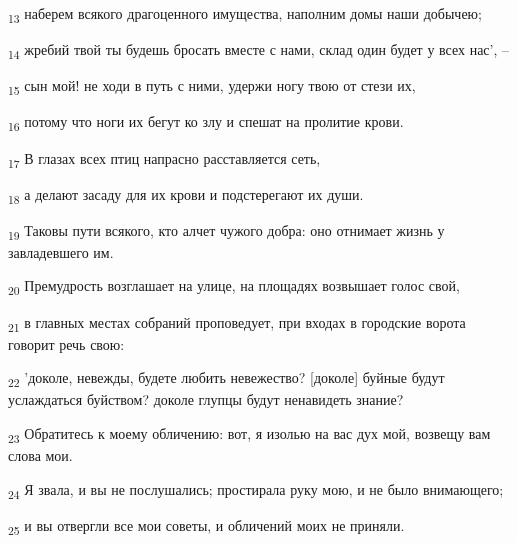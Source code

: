 \begin{tcolorbox}
\textsubscript{13} наберем всякого драгоценного имущества, наполним домы наши добычею;
\end{tcolorbox}
\begin{tcolorbox}
\textsubscript{14} жребий твой ты будешь бросать вместе с нами, склад один будет у всех нас', --
\end{tcolorbox}
\begin{tcolorbox}
\textsubscript{15} сын мой! не ходи в путь с ними, удержи ногу твою от стези их,
\end{tcolorbox}
\begin{tcolorbox}
\textsubscript{16} потому что ноги их бегут ко злу и спешат на пролитие крови.
\end{tcolorbox}
\begin{tcolorbox}
\textsubscript{17} В глазах всех птиц напрасно расставляется сеть,
\end{tcolorbox}
\begin{tcolorbox}
\textsubscript{18} а делают засаду для их крови и подстерегают их души.
\end{tcolorbox}
\begin{tcolorbox}
\textsubscript{19} Таковы пути всякого, кто алчет чужого добра: оно отнимает жизнь у завладевшего им.
\end{tcolorbox}
\begin{tcolorbox}
\textsubscript{20} Премудрость возглашает на улице, на площадях возвышает голос свой,
\end{tcolorbox}
\begin{tcolorbox}
\textsubscript{21} в главных местах собраний проповедует, при входах в городские ворота говорит речь свою:
\end{tcolorbox}
\begin{tcolorbox}
\textsubscript{22} 'доколе, невежды, будете любить невежество? [доколе] буйные будут услаждаться буйством? доколе глупцы будут ненавидеть знание?
\end{tcolorbox}
\begin{tcolorbox}
\textsubscript{23} Обратитесь к моему обличению: вот, я изолью на вас дух мой, возвещу вам слова мои.
\end{tcolorbox}
\begin{tcolorbox}
\textsubscript{24} Я звала, и вы не послушались; простирала руку мою, и не было внимающего;
\end{tcolorbox}
\begin{tcolorbox}
\textsubscript{25} и вы отвергли все мои советы, и обличений моих не приняли.
\end{tcolorbox}
